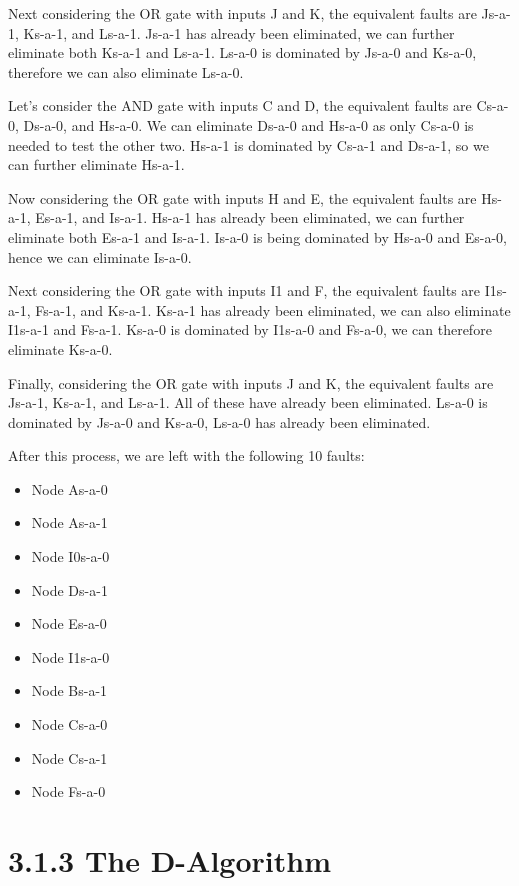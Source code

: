 \documentclass[11pt]{report}
\begin{document}
Next considering the OR gate with inputs J and K, the equivalent faults
are Js-a-1, Ks-a-1, and Ls-a-1. Js-a-1 has already been eliminated, we can
further eliminate both Ks-a-1 and Ls-a-1. Ls-a-0 is dominated by Js-a-0 and
Ks-a-0, therefore we can also eliminate Ls-a-0.

Let's consider the AND gate with inputs C and D, the equivalent faults are
Cs-a-0, Ds-a-0, and Hs-a-0. We can eliminate Ds-a-0 and Hs-a-0 as only Cs-a-0
is needed to test the other two. Hs-a-1 is dominated by Cs-a-1 and Ds-a-1, so
we can further eliminate Hs-a-1.

Now considering the OR gate with inputs H and E, the equivalent faults are
Hs-a-1, Es-a-1, and Is-a-1. Hs-a-1 has already been eliminated, we can further
eliminate both Es-a-1 and Is-a-1. Is-a-0 is being dominated by Hs-a-0 and
Es-a-0, hence we can eliminate Is-a-0.

Next considering the OR gate with inputs I1 and F, the equivalent faults are
I1s-a-1, Fs-a-1, and Ks-a-1. Ks-a-1 has already been eliminated, we can also
eliminate I1s-a-1 and Fs-a-1. Ks-a-0 is dominated by I1s-a-0 and Fs-a-0, we
can therefore eliminate Ks-a-0.

Finally, considering the OR gate with inputs J and K, the equivalent faults
are Js-a-1, Ks-a-1, and Ls-a-1. All of these have already been eliminated.
Ls-a-0 is dominated by Js-a-0 and Ks-a-0, Ls-a-0 has already been eliminated.

After this process, we are left with the following 10 faults:
\begin{itemize}
    \item Node As-a-0
    \item Node As-a-1
    \item Node I0s-a-0
    \item Node Ds-a-1
    \item Node Es-a-0
    \item Node I1s-a-0
    \item Node Bs-a-1
    \item Node Cs-a-0
    \item Node Cs-a-1
    \item Node Fs-a-0
\end{itemize}


\section*{3.1.3 The D-Algorithm}
\end{document}
